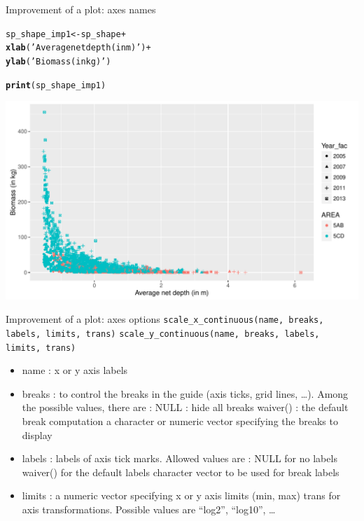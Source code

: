 \documentclass{beamer}\usepackage[]{graphicx}\usepackage[]{color}
\makeatletter
\newcommand{\hlstr}[1]{\textcolor[rgb]{0.192,0.494,0.8}{#1}}%
\newcommand{\hlopt}[1]{\textcolor[rgb]{0,0,0}{#1}}%
\newcommand{\hlstd}[1]{\textcolor[rgb]{0.345,0.345,0.345}{#1}}%
\newcommand{\hlkwb}[1]{\textcolor[rgb]{0.69,0.353,0.396}{#1}}%
\newcommand{\hlkwd}[1]{\textcolor[rgb]{0.737,0.353,0.396}{\textbf{#1}}}%
\newenvironment{kframe}{%
 \def\at@end@of@kframe{}%
 \ifinner\ifhmode%
  \def\at@end@of@kframe{\end{minipage}}%
  \begin{minipage}{\columnwidth}%
 \fi\fi%
 \def\FrameCommand##1{\hskip\@totalleftmargin \hskip-\fboxsep
 \colorbox{shadecolor}{##1}\hskip-\fboxsep
     \hskip-\linewidth \hskip-\@totalleftmargin \hskip\columnwidth}%
 \MakeFramed {\advance\hsize-\width
   \@totalleftmargin\z@ \linewidth\hsize
   \@setminipage}}%
 {\par\unskip\endMakeFramed%
 \at@end@of@kframe}
\newenvironment{knitrout}{}{} %
\makeatother
\begin{document}
\begin{frame}[fragile]{Improvement of a plot: axes names}
\begin{knitrout}\footnotesize
{}\color{fgcolor}\begin{kframe}
\begin{alltt}
\hlstd{sp_shape_imp1} \hlkwb{<-} \hlstd{sp_shape} \hlopt{+}
  \hlkwd{xlab}\hlstd{(}\hlstr{'Average net depth (in m)'}\hlstd{)} \hlopt{+}
  \hlkwd{ylab}\hlstd{(}\hlstr{'Biomass (in kg)'}\hlstd{)}

\hlkwd{print}\hlstd{(sp_shape_imp1)}
\end{alltt}
\end{kframe}

{\centering \includegraphics[width=.9\linewidth]{figure/scatter_plot_shape_imp1-1} 

}



\end{knitrout}
\end{frame}

\begin{frame}[fragile]{Improvement of a plot: axes options}
\lstinline{scale_x_continuous(name, breaks, labels, limits, trans)}
\lstinline{scale_y_continuous(name, breaks, labels, limits, trans)}

\begin{itemize}

\item    name : x or y axis labels
\item    breaks : to control the breaks in the guide (axis ticks, grid lines, …). Among the possible values, there are :
        NULL : hide all breaks
        waiver() : the default break computation
        a character or numeric vector specifying the breaks to display
\item labels : labels of axis tick marks. Allowed values are :
        NULL for no labels
        waiver() for the default labels
        character vector to be used for break labels
\item limits : a numeric vector specifying x or y axis limits (min, max)
    trans for axis transformations. Possible values are “log2”, “log10”, …

\end{itemize}
\end{frame}
\end{document}
